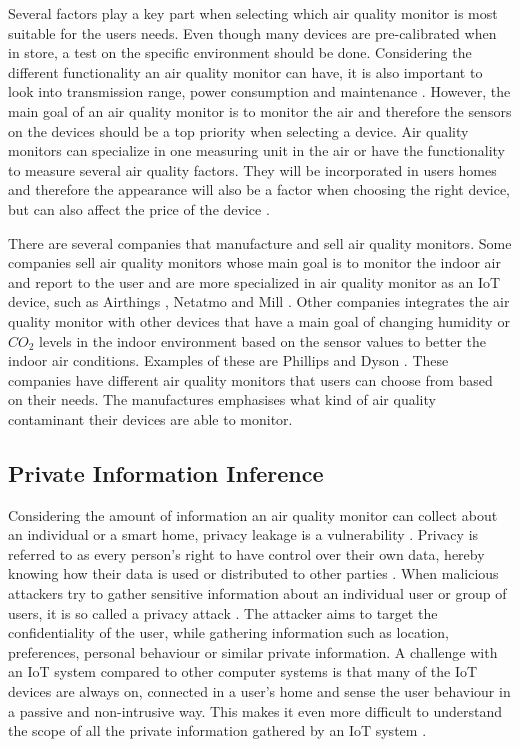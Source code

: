Several factors play a key part when selecting which air quality monitor is most suitable for the users needs. Even though many devices are pre-calibrated when in store, a test on the specific environment should be done. Considering the different functionality an air quality monitor can have, it is also important to look into transmission range, power consumption and maintenance \cite{AQMBigSource}. However, the main goal of an air quality monitor is to monitor the air and therefore the sensors on the devices should be a top priority when selecting a device. Air quality monitors can specialize in one measuring unit in the air or have the functionality to measure several air quality factors. They will be incorporated in users homes and therefore the appearance will also be a factor when choosing the right device, but can also affect the price of the device \cite{IAQMonitorCommunicationReview}. 

There are several companies that manufacture and sell air quality monitors. Some companies sell air quality monitors whose main goal is to monitor the indoor air and report to the user and are more specialized in air quality monitor as an \gls{IoT} device, such as Airthings \cite{Airthings}, Netatmo \cite{Netatmo} and Mill \cite{Mill}. Other companies integrates the air quality monitor with other devices that have a main goal of changing humidity or \(CO_2\) levels in the indoor environment based on the sensor values to better the indoor air conditions. Examples of these are Phillips \cite{Philips} and Dyson \cite{Dyson}. These companies have different air quality monitors that users can choose from based on their needs. The manufactures emphasises what kind of air quality contaminant their devices are able to monitor. 

\subsection{Private Information Inference}
Considering the amount of information an air quality monitor can collect about an individual or a smart home, privacy leakage is a vulnerability \cite{SecPrivSmartCity}. Privacy is referred to as every person's right to have control over their own data, hereby knowing how their data is used or distributed to other parties \cite{IoTSecPrivSafeEth}. When malicious attackers try to gather sensitive information about an individual user or group of users, it is so called a privacy attack \cite{CyberEntitySecInIoT}. The attacker aims to target the confidentiality of the user, while gathering information such as location, preferences, personal behaviour or similar private information. A challenge with an \gls{IoT} system compared to other computer systems is that many of the \gls{IoT} devices are always on, connected in a user's home and sense the user behaviour in a passive and non-intrusive way. This makes it even more difficult to understand the scope of all the private information gathered by an \gls{IoT} system \cite{IoTSecPrivSafeEth}.


